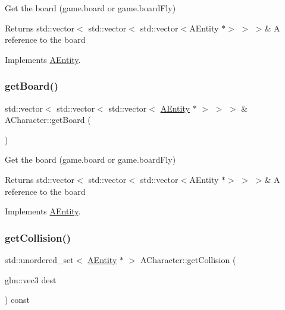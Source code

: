 Get the board (game.\+board or game.\+board\+Fly) 

\begin{DoxyReturn}{Returns}
std\+::vector$<$ std\+::vector$<$ std\+::vector$<$\+A\+Entity $\ast$$>$ $>$ $>$\& A reference to the board 
\end{DoxyReturn}


Implements \hyperlink{class_a_entity_a9ed84c8f926cf6032be480ebba7d1820}{A\+Entity}.

\mbox{\label{class_a_character_aa8f0b9b557c69eead696870c41c8321b}} 
\subsubsection{\texorpdfstring{get\+Board()}{getBoard()}\hspace{0.1cm}{\footnotesize\ttfamily [2/2]}}
{\footnotesize\ttfamily std\+::vector$<$ std\+::vector$<$ std\+::vector$<$ \hyperlink{class_a_entity}{A\+Entity} $\ast$ $>$ $>$ $>$ \& A\+Character\+::get\+Board (\begin{DoxyParamCaption}{ }\end{DoxyParamCaption})\hspace{0.3cm}{\ttfamily [virtual]}}



Get the board (game.\+board or game.\+board\+Fly) 

\begin{DoxyReturn}{Returns}
std\+::vector$<$ std\+::vector$<$ std\+::vector$<$\+A\+Entity $\ast$$>$ $>$ $>$\& A reference to the board 
\end{DoxyReturn}


Implements \hyperlink{class_a_entity_a44aa82958386de50cd9a6c836461114a}{A\+Entity}.

\mbox{\label{class_a_character_a39c7111c4b096129d040e22e3b09592d}} 
\subsubsection{\texorpdfstring{get\+Collision()}{getCollision()}}
{\footnotesize\ttfamily std\+::unordered\+\_\+set$<$ \hyperlink{class_a_entity}{A\+Entity} $\ast$ $>$ A\+Character\+::get\+Collision (\begin{DoxyParamCaption}\item[{glm\+::vec3}]{dest }\end{DoxyParamCaption}) const\hspace{0.3cm}{\ttfamily [virtual]}}



